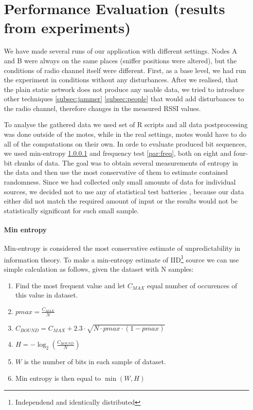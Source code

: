 \documentclass[
  print, %
  table,   %
  nolof,     %
  nolot,     %
           oneside
]{fithesis3}
\begin{document}


  \section{Performance Evaluation (results from experiments)}\label{sec:results}
  We have made several runs of our application with different settings. Nodes A and B were always on the same places (sniffer positions were altered), but the conditions of radio channel itself were different. First, as a base level, we had run the experiment in conditions without any disturbances. After we realised, that the plain static network does not produce any usable data, we tried to introduce other techniques \ref{subsec:jammer} \ref{subsec:people} that would add disturbances to the radio channel, therefore changes in the measured RSSI values.

  To analyse the gathered data we used set of R scripts %
  and all data postprocessing was done outside of the motes, while in the real settings, motes would have to do all of the computations on their own. In orde to evaluate produced bit sequences, we used min-entropy \ref{par:min} and frequency test \ref{par:freq}, both on eight and four-bit chunks of data. The goal was to obtain several measurements of entropy in the data and then use the most conservative of them to estimate contained randomness. Since we had collected only small amounts of data for individual sources, we decided not to use any of statistical test batteries %
  , because our data either did not match the required amount of input or the results would not be statistically significant for such small sample.

  \paragraph{Min entropy}\label{par:min}
Min-entropy \cite{barker2012recommendation} is considered the most conservative estimate of unpredictability in information theory. To make a min-entropy estimate of IID\footnote{Independend and identically distributed} source we can use simple calculation as follows, given the dataset with N samples:


\begin{enumerate}
  \item Find the most frequent value and let $C_{MAX}$ equal number of occurences of this value in dataset.
  \item $pmax = \frac{C_{MAX}}{N}$
  \item $C_{BOUND}=C_{MAX} + 2.3 \cdot \sqrt{N \cdot pmax \cdot ( 1- pmax)}$
  \item $H = - \log_2 (\frac{C_{BOUND}}{N}) $
  \item $W$ is the number of bits in each sample of dataset.
  \item Min entropy is then equal to $\min(W, H)$

\end{enumerate}
\end{document}
